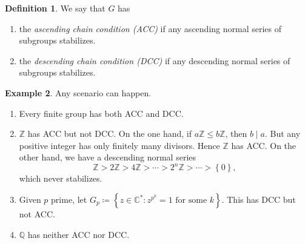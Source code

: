 \documentclass[10pt,letterpaper,cm]{nupset}
\theoremstyle{definition}
\newtheorem{definition}{Definition}[subsection]
\newtheorem{exmp}[definition]{Example}
\theoremstyle{theorem}
\theoremstyle{remark}
\newcommand{\C}{\mathbb C}
\newcommand{\Q}{\mathbb Q}
\newcommand{\Z}{\mathbb Z}
\newcommand{\1}{\mathbf{1}}
\newcommand{\0}{\vec 0}
\newcommand{\dcc}{\textsf{DCC}\xspace}
\newcommand{\acc}{\textsf{ACC}\xspace}
\begin{document}
\begin{definition}\label{ACC} We say that $G$ has 
\begin{enumerate}
\item the \textit{ascending chain condition (\acc)} if any ascending normal series of subgroups stabilizes.
\item the \textit{descending chain condition (\dcc)} if any descending normal series of subgroups stabilizes.
\end{enumerate}
\end{definition}

\begin{exmp} Any scenario can happen.
\begin{enumerate}
\item Every finite group has both \acc and \dcc.
\item $\Z$ has \acc but not \dcc. On the one hand, if $a\Z \leq b\Z$, then $b\mid a$. But any positive integer has only finitely many divisors. Hence $\Z$ has \acc. On the other hand, we have a descending normal series
\[
\Z > 2\Z > 4\Z >\cdots >2^n\Z> \cdots >\left\{0\right\}
,\] which never stabilizes. 
\item Given $p$ prime, let $G_p \coloneqq  \left\{z\in \C^{\ast} : z^{p^k} =1 \text{ for some } k \right\}$. This has \dcc but not \acc.  
\item $\Q$ has neither \acc nor \dcc.
\end{enumerate}
\end{exmp}
\end{document}
